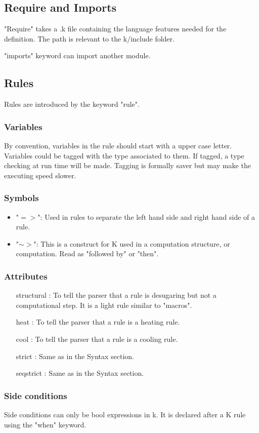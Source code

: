 \documentclass[a4paper]{article}
\begin{document}
\subsection{Require and Imports}
"Require" takes a .k file containing the language features needed for the definition. The path is relevant to the k/include folder.

"imports" keyword can import another module.

\subsection{Rules}
Rules are introduced by the keyword "rule".
\subsubsection{Variables}
By convention, variables in the rule should start with a upper case letter. Variables could be tagged with the type associated to them. If tagged, a type checking at run time will be made. Tagging is formally saver but may make the executing speed slower.
\subsubsection{Symbols}
\begin{itemize}
    \item "$=>$": Used in rules to separate the left hand side and right hand side of a rule.
    \item "$\sim>$": This is a construct for K used in a computation structure, or computation. Read as "followed by" or "then". 
\end{itemize}
\subsubsection{Attributes}
\begin{itemize}
    \item [structural]: To tell the parser that a rule is desugaring but not a computational step. It is a light rule similar to "macros".
    \item [heat]: To tell the parser that a rule is a heating rule.
    \item [cool]: To tell the parser that a rule is a cooling rule.
    \item [strict]: Same as in the Syntax section.
    \item [seqstrict]: Same as in the Syntax section.
\end{itemize}
\subsubsection{Side conditions}
Side conditions can only be bool expressions in k. It is declared after a K rule using the "when" keyword.
\end{document}
